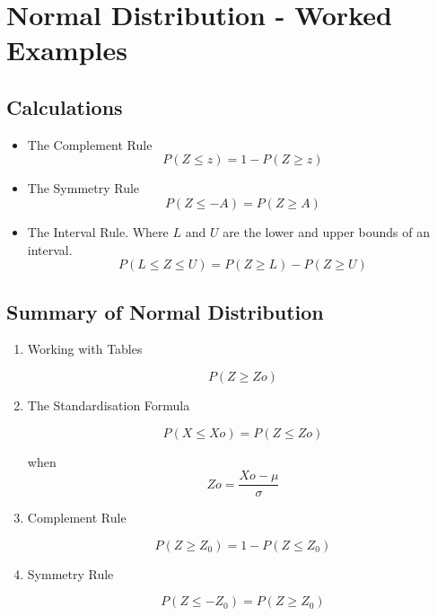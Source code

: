 \documentclass[]{report}
\begin{document}
\chapter{Normal Distribution - Worked Examples}
\section{Calculations}

\begin{framed}
	\begin{itemize}
		\item The Complement Rule
		\begin{equation}
		P(Z \leq z) = 1 - P(Z \geq z)
		\end{equation}
		\item The Symmetry Rule
		\begin{equation}
		P(Z \leq -A) = P(Z \geq A)
		\end{equation}
		\item The Interval Rule.
		Where $L$ and $U$ are the lower and upper bounds of an interval.
		\begin{equation}
		P(L \leq Z \leq U) = P(Z \geq L) -  P(Z \geq U)
		\end{equation}
		
	\end{itemize}
\end{framed}

\section{Summary of Normal Distribution}

\begin{enumerate}
	\item Working with Tables
	
	\[P(Z \geq Zo)\]
	
	\item The Standardisation Formula
	
	\[P(X \leq Xo) = P(Z \leq Zo)	  \]  
	
	when   \[Zo=\frac{Xo- \mu}{\sigma}\]
	
	\item Complement Rule
	
	\[P(Z\geq Z_0) = 1 - P(Z \leq Z_0)\]
	
	\item  Symmetry Rule
	
	
	\[P(Z \leq -Z_0) = P(Z \geq Z_0)\]
	
\end{enumerate}
\end{document}

